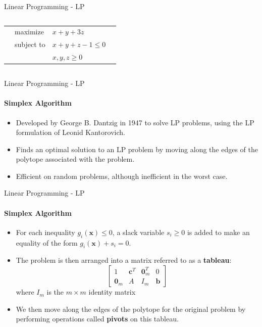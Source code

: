 \documentclass{beamer}
\renewcommand{\vec}{\mathbf}
\begin{document}
\begin{frame}{Linear Programming - LP}
\begin{columns}[T]
\begin{column}{0.5\textwidth}
				\small
				\begin{tabularx}{\textwidth}{X l l X}
					& maximize		& $x + y + 3z$		& \\
					& subject to	& $x+y+z-1\leq 0$	& \\
					&				& $x, y, z\geq 0$ &
				\end{tabularx}
			\end{column}
			
		\end{columns}
	\end{frame}

	\begin{frame}{Linear Programming - LP}
		\framesubtitle{Simplex Algorithm}
		\begin{itemize}
			\item Developed by George B. Dantzig in 1947 to solve LP problems, using the LP formulation of Leonid Kantorovich.
			\item Finds an optimal solution to an LP problem by moving along the edges of the polytope associated with the problem.
			\item Efficient on random problems, although inefficient in the worst case.
		\end{itemize}
	\end{frame}

	\begin{frame}{Linear Programming - LP}
		\framesubtitle{Simplex Algorithm}
		\begin{itemize}
			\item For each inequality $g_i(\vec{x})\leq 0$, a slack variable $s_i \geq 0$ is added to make an equality of the form $g_i(\vec{x}) + s_i = 0$.
			\item The problem is then arranged into a matrix referred to as a \textbf{tableau}:\[
			\begin{bmatrix}
				1 & \vec{c}^T & \vec{0}_m^T & 0\\
				\vec{0}_m & A & I_m & \vec{b}
			\end{bmatrix}\]
			where $I_m$ is the $m \times m$ identity matrix
			\item We then move along the edges of the polytope for the original problem by performing operations called \textbf{pivots} on this tableau.
		\end{itemize}
	\end{frame}
\end{document}
